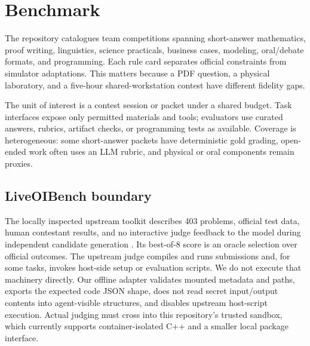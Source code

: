 \section{Benchmark}
The repository catalogues team competitions spanning short-answer
mathematics, proof writing, linguistics, science practicals, business cases,
modeling, oral/debate formats, and programming. Each rule card separates
official constraints from simulator adaptations. This matters because a PDF
question, a physical laboratory, and a five-hour shared-workstation contest
have different fidelity gaps.

The unit of interest is a contest session or packet under a shared budget.
Task interfaces expose only permitted materials and tools; evaluators use
curated answers, rubrics, artifact checks, or programming tests as available.
Coverage is heterogeneous: some short-answer packets have deterministic gold
grading, open-ended work often uses an LLM rubric, and physical or oral
components remain proxies.

\subsection{LiveOIBench boundary}
The locally inspected upstream toolkit describes 403 problems, official test
data, human contestant results, and no interactive judge feedback to the model
during independent candidate generation \cite{zou2025liveoibench}. Its
best-of-8 score is an oracle selection over official outcomes. The upstream
judge compiles and runs submissions and, for some tasks, invokes host-side
setup or evaluation scripts. We do not execute that machinery directly.
Our offline adapter validates mounted metadata and paths, exports the expected
code JSON shape, does not read secret input/output contents into agent-visible
structures, and disables upstream host-script execution. Actual judging must
cross into this repository's trusted sandbox, which currently supports
container-isolated C++ and a smaller local package interface.

